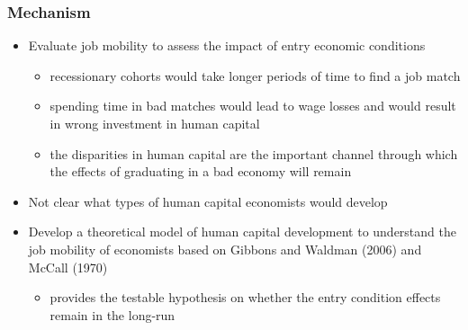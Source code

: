 \documentclass[11pt]{beamer}
\begin{document}
\begin{frame}
	\frametitle{Mechanism} 
	\begin{itemize}
		\item Evaluate job mobility to assess the impact of entry economic conditions
		\begin{itemize}
			\item recessionary cohorts would take longer periods of time to find a job match
			\item spending time in bad matches would lead to wage losses and would result in wrong investment in human capital
			\item  the disparities in human capital are the important channel through which the effects of graduating in a bad economy will remain
		\end{itemize}
		\item Not clear what types of human capital economists would develop
		\item Develop a theoretical model of human capital development to understand the job mobility of economists based on Gibbons and Waldman (2006) and McCall (1970)
		\begin{itemize}
			\item provides the testable hypothesis on whether the entry condition effects remain in the long-run
		\end{itemize}

		
	\end{itemize}
\end{frame}
\end{document}
